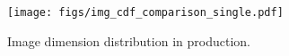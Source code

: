 \begin{figure}[!t]
    \centering
    \texttt{[image: figs/img\_cdf\_comparison\_single.pdf]}
    \caption{Image dimension distribution in production.
    }
    \label{fig:img-dim-prod}
\end{figure}